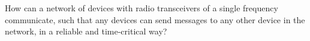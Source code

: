 
\bigskip

{\addtolength{\leftskip}{10mm}\addtolength{\rightskip}{10mm}\noindent\hrulefill\it

\noindent How can a network of devices with radio transceivers of a single frequency communicate, such that any devices can send messages to any other device in the network, in a reliable and time-critical way?

\noindent\hrulefill

}



